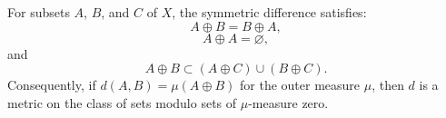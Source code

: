 For subsets $A$, $B$, and $C$ of $X$, the symmetric difference satisfies:
$$A \oplus B = B \oplus A,$$
$$A \oplus A = \varnothing,$$
and
$$A \oplus B \subset (A \oplus C) \cup (B \oplus C).$$
Consequently, if $d(A,B) = \mu(A \oplus B)$ for the outer measure $\mu$, then $d$ is a metric on the class of sets modulo sets of $\mu$-measure zero.

